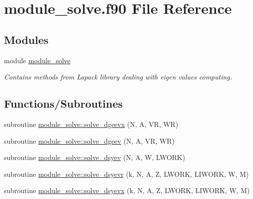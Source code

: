 \hypertarget{module__solve_8f90}{}\section{module\+\_\+solve.\+f90 File Reference}
\label{module__solve_8f90}
\subsection*{Modules}
\begin{DoxyCompactItemize}
\item 
module \hyperlink{namespacemodule__solve}{module\+\_\+solve}
\begin{DoxyCompactList}\small\item\em Contains methods from Lapack library dealing with eigen values computing. \end{DoxyCompactList}\end{DoxyCompactItemize}
\subsection*{Functions/\+Subroutines}
\begin{DoxyCompactItemize}
\item 
subroutine \hyperlink{namespacemodule__solve_a6e1a9cb766d06da8f5ac09592d460849}{module\+\_\+solve\+::solve\+\_\+dgeevx} (N, A, V\+R, W\+R)
\item 
subroutine \hyperlink{namespacemodule__solve_a2a2b6bf2dc5b4e3d08908fa43fca207b}{module\+\_\+solve\+::solve\+\_\+dgeev} (N, A, V\+R, W\+R)
\item 
subroutine \hyperlink{namespacemodule__solve_a52e46b41df1e4cf29e5ae9e908ed4293}{module\+\_\+solve\+::solve\+\_\+dsyev} (N, A, W, L\+W\+O\+R\+K)
\item 
subroutine \hyperlink{namespacemodule__solve_a71d616a8ea24efa60b9d9227d0a40309}{module\+\_\+solve\+::solve\+\_\+dsyevr} (k, N, A, Z, L\+W\+O\+R\+K, L\+I\+W\+O\+R\+K, W, M)
\item 
subroutine \hyperlink{namespacemodule__solve_af9f9bed9d344018397cbc722f70a6bb0}{module\+\_\+solve\+::solve\+\_\+dsyevx} (k, N, A, Z, L\+W\+O\+R\+K, L\+I\+W\+O\+R\+K, W, M)
\end{DoxyCompactItemize}
